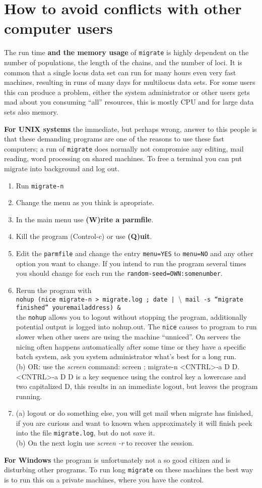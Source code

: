 \section{How to avoid conflicts with other computer users}
The run time {\bf and the memory usage} of {\tt migrate} is 
highly dependent on the number of populations,
the length of the chains, and the number of loci.
It is common that a single locus data set can run for many hours even
very fast machines, resulting in runs of many days for
multilocus data sets.  For some users this can produce a problem,
either the system administrator or other users gets mad about you
consuming ``all'' resources, this is mostly CPU and for large data
sets also memory. 
\par
{\bf For UNIX systems} the immediate, but perhaps wrong, 
answer to this people is that these demanding programs are one 
of the reasons to use these fast computers; 
a run of {\tt migrate} does normally not compromise
any editing, mail reading, word processing on shared machines.
To free a terminal you can put migrate into background and log out.
\begin{enumerate}
\item Run {\tt migrate-n}
\item Change the menu as you think is apropriate.
\item In the main menu use {\bf (W)rite a parmfile}.
\item Kill the program (Control-c) or use {\bf (Q)uit}.
\item Edit the {\tt parmfile} and change the entry {\tt menu=YES}
to {\tt menu=NO} and any other option you want to change.
If you intend to run the program several times you should change
for each run the {\tt random-seed=OWN:somenumber}.
\item Rerun the program with\\
{\tt nohup (nice migrate-n > migrate.log ; date | $\setminus$
mail -s ``migrate finished'' youremailaddress) \&}\\
the {\tt nohup} allows you to logout without stopping the program, 
additionally potential output is logged into nohup.out.
The {\tt nice} causes to program to run slower when other users are 
using the machine ``unniced''. On servers the nicing often happens
automatically after some time or they have a specific batch system, 
ask you system administrator what's
best for a long run.\\
(b) OR: use the \textsl{screen} command: screen ; migrate-n <CNTRL>-a D D.
<CNTRL>-a D D is a key sequence using the control key a lowercase and two capitalized D, this results in an immediate logout, but leaves the program running. 
\item (a) logout or do something else, you will get mail when
migrate has finished, if you are curious and want to known when approximately it will finish peek into the file {\tt migrate.log}, but do not save it.\\(b) On the next login use \textsl{screen -r} to recover the session.
\end{enumerate}
\par
{\bf For  Windows} the program is 
unfortunately not a so good citizen and is disturbing other programs.
To run long {\tt migrate} on these machines the best way is
to run this on a private machines, where you have the control.
\newpage
